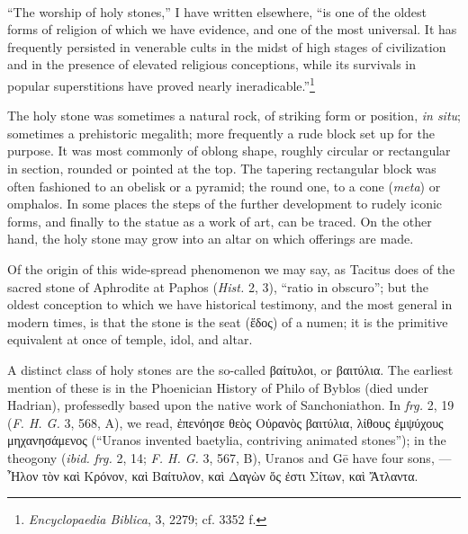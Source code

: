 \documentclass[a4paper, 12pt, oneside, polutonikogreek, english]{article}
\begin{document}
\paragraph{}
``The worship of holy stones,'' I have written elsewhere, ``is one of the oldest forms of religion of which we have evidence, and one of the most universal. It has frequently persisted in venerable cults in the midst of high stages of civilization and in the presence of elevated religious conceptions, while its survivals in popular superstitions have proved nearly ineradicable.''\footnote{\emph{Encyclopaedia Biblica}, 3, 2279; cf. 3352 f.}

The holy stone was sometimes a natural rock, of striking form or position, \emph{in situ}; sometimes a prehistoric megalith; more frequently a rude block set up for the purpose. It was most commonly of oblong shape, roughly circular or rectangular in section, rounded or pointed at the top. The tapering rectangular block was often fashioned to an obelisk or a pyramid; the round one, to a cone (\emph{meta}) or omphalos. In some places the steps of the further development to rudely iconic forms, and finally to the statue as a work of art, can be traced. On the other hand, the holy stone may grow into an altar on which offerings are made.

Of the origin of this wide-spread phenomenon we may say, as Tacitus does of the sacred stone of Aphrodite at Paphos (\emph{Hist.} 2, 3), ``ratio in obscuro''; but the oldest conception to which we have historical testimony, and the most general in modern times, is that the stone is the seat (ἕδος) of a numen; it is the primitive equivalent at once of temple, idol, and altar.

A distinct class of holy stones are the so-called βαίτυλοι, or βαιτύλια. The earliest mention of these is in the Phoenician History of Philo of Byblos (died under Hadrian), professedly based upon the native work of Sanchoniathon. In \emph{frg.} 2, 19 (\emph{F. H. G.} 3, 568, A), we read, ἐπενόησε θεὸς Οὐρανὸς βαιτύλια, λίθους ἐμψύχους μηχανησάμενος (``Uranos invented baetylia, contriving animated stones''); in the theogony (\emph{ibid.} \emph{frg.} 2, 14; \emph{F. H. G.} 3, 567, B), Uranos and Gē have four sons, --- Ἦλον τὸν καὶ Κρόνον, καὶ Βαίτυλον, καὶ Δαγὼν ὅς ἐστι Σίτων, καὶ Ἄτλαντα.
\end{document}
